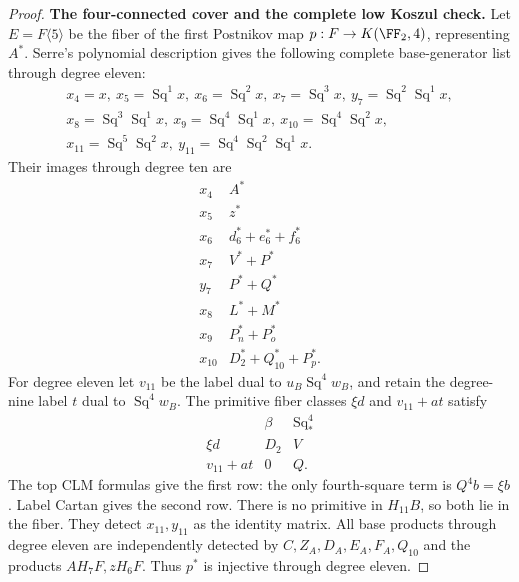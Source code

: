 \begin{proof}
\medskip\noindent
\textbf{The four-connected cover and the complete low Koszul check.}
Let $E=F\langle5\rangle$ be the fiber of the first Postnikov
map $p:F\to K(\FF_2,4)$, representing $A^*$.
Serre's polynomial description \cite[Section 2]{I_Serre1953}
gives the following complete base-generator list through degree eleven:
\[
\begin{gathered}
 x_4=x,\ x_5=\operatorname{Sq}^1x,\ x_6=\operatorname{Sq}^2x,
 \ x_7=\operatorname{Sq}^3x,\ y_7=\operatorname{Sq}^2\operatorname{Sq}^1x,\\
 x_8=\operatorname{Sq}^3\operatorname{Sq}^1x,
 \ x_9=\operatorname{Sq}^4\operatorname{Sq}^1x,
 \ x_{10}=\operatorname{Sq}^4\operatorname{Sq}^2x,\\
 x_{11}=\operatorname{Sq}^5\operatorname{Sq}^2x,
 \ y_{11}=\operatorname{Sq}^4\operatorname{Sq}^2\operatorname{Sq}^1x.
\end{gathered}
\]
Their images through degree ten are
\[
\begin{array}{c|l}
 x_4&A^*\\
 x_5&z^*\\
 x_6&d_6^*+e_6^*+f_6^*\\
 x_7&V^*+P^*\\
 y_7&P^*+Q^*\\
 x_8&L^*+M^*\\
 x_9&P_n^*+P_o^*\\
 x_{10}&D_2^*+Q_{10}^*+P_p^*.
\end{array}
\tag{D.2.22a10}
\]
For degree eleven let $v_{11}$ be the label dual to
$u_B\operatorname{Sq}^4w_B$, and retain the degree-nine label
$t$ dual to $\operatorname{Sq}^4w_B$. The primitive fiber
classes $\xi d$ and $v_{11}+at$ satisfy
\[
\begin{array}{c|cc}
 &\beta&\operatorname{Sq}_*^4\\\hline
 \xi d&D_2&V\\
 v_{11}+at&0&Q.
\end{array}
\tag{D.2.22a11}
\]
The top CLM formulas give the first row: the only fourth-square
term is $Q^4b=\xi b$. Label Cartan gives the second row.
There is no primitive in $H_{11}B$, so both lie in the fiber.
They detect $x_{11},y_{11}$ as the identity matrix.
All base products through degree eleven are independently detected
by $C,Z_A,D_A,E_A,F_A,Q_{10}$ and the products
$AH_7F,zH_6F$. Thus $p^*$ is injective through degree eleven.


\end{proof}
